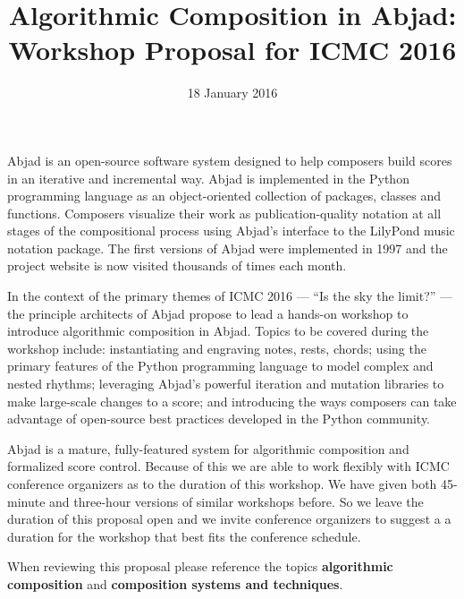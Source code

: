 \documentclass[12pt]{article}
\author{}
\title{Algorithmic Composition in Abjad: \\ Workshop Proposal for ICMC 2016}
\date{18 January 2016}
\begin{document}
\maketitle
\thispagestyle{empty}

Abjad is an open-source software system designed to help composers build scores in an iterative and incremental way. Abjad is implemented in the Python programming language as an object-oriented collection of packages, classes and functions. Composers visualize their work as publication-quality notation at all stages of the compositional process using Abjad's interface to the LilyPond music notation package. The first versions of Abjad were implemented in 1997 and the project website is now visited thousands of times each month.

In the context of the primary themes of ICMC 2016 --- ``Is the sky the limit?'' --- the principle architects of Abjad propose to lead a hands-on workshop to introduce algorithmic composition in Abjad. Topics to be covered during the workshop include: instantiating and engraving notes, rests, chords; using the primary features of the Python programming language to model complex and nested rhythms; leveraging  Abjad's powerful iteration and mutation libraries to make large-scale changes to a score;  
and introducing the ways composers can take advantage of open-source best practices developed in the Python community.

Abjad is a mature, fully-featured system for algorithmic composition and formalized score control. Because of this we are able to work flexibly with ICMC conference organizers as to the duration of this workshop. We have given both 45-minute and three-hour versions of similar workshops before. So we leave the duration of this proposal open and we invite conference organizers to suggest a a duration for the workshop that best fits the conference schedule.

When reviewing this proposal please reference the topics \textbf{algorithmic composition} and \textbf{composition systems and techniques}.
\end{document}
